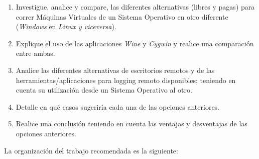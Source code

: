 \documentclass[12pt]{article}
\begin{document}
\begin{enumerate}

    \item Investigue, analice y compare,  las diferentes alternativas (libres
        y pagas)  para correr Máquinas Virtuales de un Sistema Operativo en
        otro diferente (\emph{Windows} en \emph{Linux y viceversa}).

    \item Explique el uso de las aplicaciones \emph{Wine} y \emph{Cygwin} y
        realice una comparación entre ambas.

    \item Analice las diferentes alternativas de escritorios remotos y de las
        herramientas/aplicaciones para logging remoto disponibles; teniendo en
        cuenta su utilización desde un Sistema Operativo al otro.

    \item Detalle en qué casos sugeriría cada una de las opciones anteriores.

    \item Realice una conclusión teniendo en cuenta las ventajas y desventajas
        de las opciones anteriores.

\end{enumerate}

La organización del trabajo recomendada es la siguiente:
\end{document}
